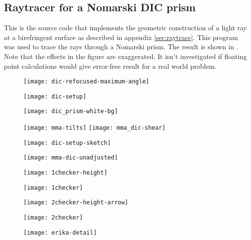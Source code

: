 \subsection{Raytracer for a Nomarski DIC prism}
\label{sec:source-raytrace}
This is the source code that implements the geometric construction of
a light ray at a birefringent surface as described in appendix
\ref{sec:raytrace}. This program was used to trace the rays through a
Nomarski prism. The result is shown in . Note
that the effects in the figure are exaggerated. It isn't investigated
if floating point calculations would give error-free result for a real
world problem.


\begin{figure}[htbp]
  \centering
  \texttt{[image: dic-refocused-maximum-angle]}
  \caption{}
  \label{fig:dic-refocused-maximum}
\end{figure}


\begin{figure}[htbp]
  \centering
  \texttt{[image: dic-setup]}
  \caption{}
  \label{fig:dic-setup}
\end{figure}


\begin{figure}[htbp]
  \centering
  \texttt{[image: dic\_prism-white-bg]}
  \caption{}
  \label{fig:dic_prism-white}
\end{figure}


\begin{figure}[htbp]
  \centering
  \texttt{[image: mma-tilts]}
  \texttt{[image: mma\_dic-shear]}
  \caption{}
  \label{fig:mma-tilts}
\end{figure}

\begin{figure}[htbp]
  \centering
  \texttt{[image: dic-setup-sketch]}
  \caption{}
  \label{fig:dic-setup-sketch}
\end{figure}

\begin{figure}[htbp]
  \centering
  \texttt{[image: mma-dic-unadjusted]}
  \caption{}
  \label{fig:mma-dic-unadjusted}
\end{figure}
\begin{figure}[htbp]
  \centering
  \texttt{[image: 1checker-height]}
  \caption{}
  \label{fig:1checker-height}
\end{figure}
\begin{figure}[htbp]
  \centering
  \texttt{[image: 1checker]}
  \caption{}
  \label{fig:1checker}
\end{figure}
\begin{figure}[htbp]
  \centering
  \texttt{[image: 2checker-height-arrow]}
  \caption{}
  \label{fig:height-arrow}
\end{figure}
\begin{figure}[htbp]
  \centering
  \texttt{[image: 2checker]}
  \caption{}
  \label{fig:2checker}
\end{figure}
\begin{figure}[htbp]
  \centering
  \texttt{[image: erika-detail]}
  \caption{}
  \label{fig:detail}
\end{figure}

